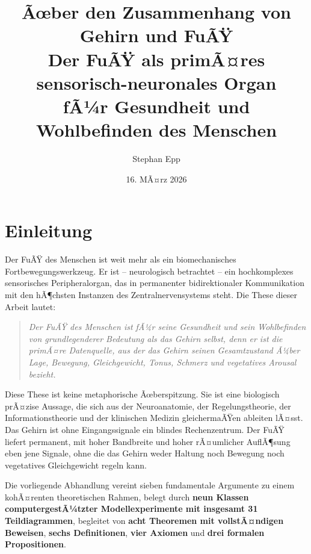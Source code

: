 ﻿\documentclass[12pt,a4paper]{report}
\title{\textbf{Ãœber den Zusammenhang von Gehirn und FuÃŸ}\\
Der FuÃŸ als primÃ¤res sensorisch-neuronales Organ\\
fÃ¼r Gesundheit und Wohlbefinden des Menschen}
\author{Stephan Epp}
\date{16. MÃ¤rz 2026}
\theoremstyle{plain}
\theoremstyle{definition}
\theoremstyle{remark}
\begin{document}
\maketitle
\tableofcontents
\newpage

\chapter{Einleitung}

Der FuÃŸ des Menschen ist weit mehr als ein biomechanisches Fortbewegungswerkzeug.
Er ist -- neurologisch betrachtet -- ein hochkomplexes sensorisches Peripheralorgan,
das in permanenter bidirektionaler Kommunikation mit den hÃ¶chsten Instanzen des
Zentralnervensystems steht. Die These dieser Arbeit lautet:

\begin{quote}
\textit{Der FuÃŸ des Menschen ist fÃ¼r seine Gesundheit und sein Wohlbefinden
von grundlegenderer Bedeutung als das Gehirn selbst, denn er ist die primÃ¤re
Datenquelle, aus der das Gehirn seinen Gesamtzustand Ã¼ber Lage, Bewegung,
Gleichgewicht, Tonus, Schmerz und vegetatives Arousal bezieht.}
\end{quote}

Diese These ist keine metaphorische Ãœberspitzung. Sie ist eine biologisch
prÃ¤zise Aussage, die sich aus der Neuroanatomie, der Regelungstheorie,
der Informationstheorie und der klinischen Medizin gleichermaÃŸen ableiten lÃ¤sst.
Das Gehirn ist ohne Eingangssignale ein blindes Rechenzentrum. Der FuÃŸ liefert
permanent, mit hoher Bandbreite und hoher rÃ¤umlicher AuflÃ¶sung eben jene
Signale, ohne die das Gehirn weder Haltung noch Bewegung noch vegetatives
Gleichgewicht regeln kann.

Die vorliegende Abhandlung vereint sieben fundamentale Argumente zu einem
kohÃ¤renten theoretischen Rahmen, belegt durch \textbf{neun Klassen
computergestÃ¼tzter Modellexperimente mit insgesamt 31 Teildiagrammen},
begleitet von \textbf{acht Theoremen mit vollstÃ¤ndigen Beweisen},
\textbf{sechs Definitionen}, \textbf{vier Axiomen} und
\textbf{drei formalen Propositionen}.
\end{document}
